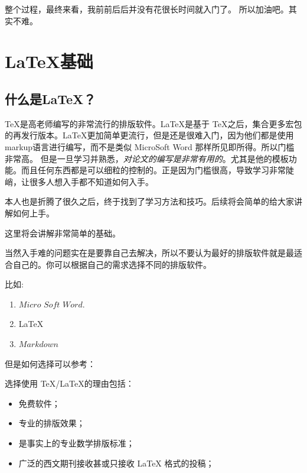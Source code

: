 \documentclass[UTF8,AutoFakeBold]{ctexart}
\numberwithin{figure}{section}
\numberwithin{table}{section}
\begin{document}
整个过程，最终来看，我前前后后并没有花很长时间就入门了。 所以加油吧。其实不难。
\clearpage


\begin{abstract}
    本文是记录在学习\LaTeX 过程中遇到的问题和解决办法，并用\LaTeX 写出来。

    真的好困难。希望大家在看到这个文档的时候，点个赞！$\heartsuit$$\heartsuit$$\heartsuit$

    本文托管在 GitHub 中，链接地址：\href{https://github.com/heartacker/MyNotes}{https://github.com/heartacker/MyNotes}，使用 VSCode 作为编辑器，TexLive 作为编译器进行编写。 可以转到 \href{https://github.com/heartacker/MyNotes/releases}{release} 页面获取此文档最新版本。

\end{abstract}

\section{\LaTeX 基础}
\label{sec:knowledge}

\subsection{什么是\LaTeX？}
\TeX 是高老师编写的非常流行的排版软件。\LaTeX 是基于 \TeX 之后，集合更多宏包的再发行版本。\LaTeX 更加简单更流行，但是还是很难入门，因为他们都是使用markup语言进行编写，而不是类似 MicroSoft Word 那样所见即所得。所以门槛非常高。
但是一旦学习并熟悉，\emph{对论文的编写是非常有用的}。尤其是他的模板功能。而且任何东西都是可以细粒的控制的。正是因为门槛很高，导致学习非常陡峭，让很多人想入手都不知道如何入手。

本人也是折腾了很久之后，终于找到了学习方法和技巧。后续将会简单的给大家讲解如何上手。

这里将会讲解非常简单的基础。

当然入手难的问题实在是要靠自己去解决，所以不要认为最好的排版软件就是最适合自己的。你可以根据自己的需求选择不同的排版软件。

比如:
\begin{enumerate}
    \item $Micro$ $Soft$ $Word$.
    \item \LaTeX
    \item $Markdown$
\end{enumerate}


但是如何选择可以参考：

\Checkmark 选择使用 \TeX /\LaTeX 的理由包括：

\begin{itemize}
    \item 免费软件；
    \item 专业的排版效果；
    \item 是事实上的专业数学排版标准；
    \item 广泛的西文期刊接收甚或只接收 LaTeX 格式的投稿；
\end{itemize}
\end{document}
